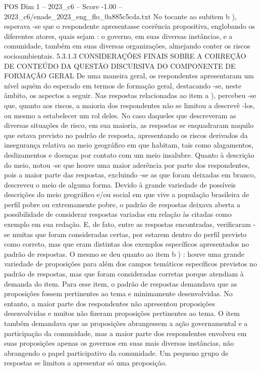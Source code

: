 \begin{textsample}{POS Dim 1 – 2023\_c6 – Score -1.00 – 2023\_c6/enade\_2023\_eng\_flo\_0a885c5cda.txt}
No tocante ao subitem b ), esperava -se que o respondente apresentasse coerência propositiva, englobando os diferentes atores, quais sejam : o governo, em suas diversas instâncias, e a comunidade, também em suas diversas organizações, almejando conter os riscos socioambientais. 5.3.1.3 CONSIDERAÇÕES FINAIS SOBRE A CORREÇÃO DE CONTEÚDO DA QUESTÃO DISCURSIVA DO COMPONENTE DE FORMAÇÃO GERAL De uma maneira geral, os respondentes apresentaram um nível aquém do esperado em termos de formação geral, destacando -se, neste âmbito, os aspectos a seguir.
Nas respostas relacionadas ao item a ), percebeu -se que, quanto aos riscos, a maioria dos respondentes não se limitou a descrevê -los, ou mesmo a estabelecer um rol deles.
No caso daqueles que descreveram as diversas situações de risco, em sua maioria, as respostas se enquadraram naquilo que estava previsto no padrão de resposta, apresentando os riscos derivados da insegurança relativa ao meio geográfico em que habitam, tais como alagamentos, deslizamentos e doenças por contato com um meio insalubre.
Quanto à descrição do meio, notou -se que houve uma maior aderência por parte dos respondentes, pois a maior parte das respostas, excluindo -se as que foram deixadas em branco, descreveu o meio de alguma forma.
Devido à grande variedade de possíveis descrições do meio geográfico e/ou social em que vive a população brasileira de perfil pobre ou extremamente pobre, o padrão de respostas deixava aberta a possibilidade de considerar respostas variadas em relação às citadas como exemplo em sua redação.
E, de fato, entre as respostas encontradas, verificaram -se muitas que foram consideradas certas, por estarem dentro do perfil previsto como correto, mas que eram distintas dos exemplos específicos apresentados no padrão de respostas.
O mesmo se deu quanto ao item b ) : houve uma grande variedade de proposições para além dos campos temáticos específicos previstos no padrão de respostas, mas que foram consideradas corretas porque atendiam à demanda do item.
Para esse item, o padrão de respostas demandava que as proposições fossem pertinentes ao tema e minimamente desenvolvidas.
No entanto, a maior parte dos respondentes não apresentou proposições desenvolvidas e muitos não fizeram proposições pertinentes ao tema.
O item também demandava que as proposições abrangessem a ação governamental e a participação da comunidade, mas a maior parte dos respondentes envolveu em suas proposições apenas os governos em suas mais diversas instâncias, não abrangendo o papel participativo da comunidade.
Um pequeno grupo de respostas se limitou a apresentar só uma proposição.

\end{textsample}
